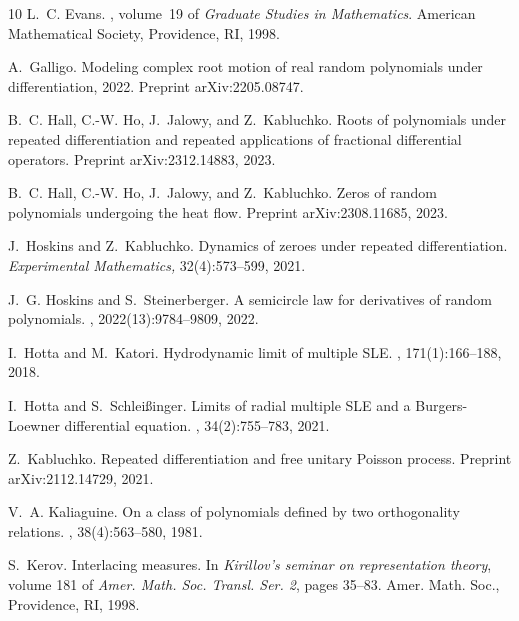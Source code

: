 \documentclass[reqno,11pt]{amsart}
\theoremstyle{plain}
\theoremstyle{definition}
\theoremstyle{remark}
\numberwithin{equation}{section}
\numberwithin{equation}{section}
\begin{document}
\begin{thebibliography}{10}
	L.~C. Evans.
	, volume~19 of {\em Graduate
		Studies in Mathematics}.
	\newblock American Mathematical Society, Providence, RI, 1998.
	
	A.~Galligo.
	\newblock Modeling complex root motion of real random polynomials under
	differentiation, 2022.
	\newblock Preprint {arXiv:2205.08747}.
	
	B.~C. Hall, C.-W. Ho, J.~Jalowy, and Z.~Kabluchko.
	\newblock Roots of polynomials under repeated differentiation and repeated
	applications of fractional differential operators.
	\newblock Preprint {arXiv:2312.14883}, 2023.
	
	B.~C. Hall, C.-W. Ho, J.~Jalowy, and Z.~Kabluchko.
	\newblock Zeros of random polynomials undergoing the heat flow.
	\newblock Preprint {arXiv:2308.11685}, 2023.
	
	J.~Hoskins and Z.~Kabluchko.
	\newblock Dynamics of zeroes under repeated differentiation.
	\newblock \textit{Experimental Mathematics,} 32(4):573--599, 2021.
	
	J.~G. Hoskins and S.~Steinerberger.
	\newblock A semicircle law for derivatives of random polynomials.
	, 2022(13):9784--9809, 2022.
	
	I.~Hotta and M.~Katori.
	\newblock Hydrodynamic limit of multiple {SLE}.
	, 171(1):166--188, 2018.
	
	I.~Hotta and S.~Schlei\ss inger.
	\newblock Limits of radial multiple {SLE} and a {B}urgers-{L}oewner
	differential equation.
	, 34(2):755--783, 2021.
	
	Z.~Kabluchko.
	\newblock Repeated differentiation and free unitary Poisson process.
	\newblock Preprint {arXiv:2112.14729}, 2021.
	
	V.~A. Kaliaguine.
	\newblock On a class of polynomials defined by two orthogonality relations.
	, 38(4):563--580, 1981.
	
	S.~Kerov.
	\newblock Interlacing measures.
	\newblock In {\em Kirillov's seminar on representation theory}, volume 181 of
	{\em Amer. Math. Soc. Transl. Ser. 2}, pages 35--83. Amer. Math. Soc.,
	Providence, RI, 1998.
	

\end{thebibliography}
\end{document}
